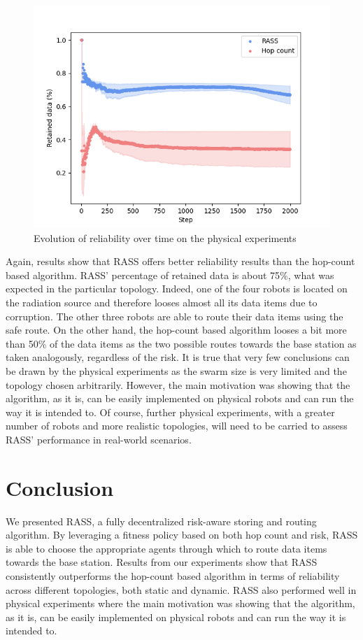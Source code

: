 \begin{figure}[htbp]
	\centering
    \includegraphics[width=0.90\columnwidth]{images/reliability.png}
    \caption{Evolution of reliability over time on the physical experiments}
    \label{results:physicalRelaibility}
\end{figure}


Again, results show that RASS offers better reliability results than the hop-count based algorithm. RASS' percentage of retained data is about 75\%, what was expected in the particular topology. Indeed, one of the four robots is located on the radiation source and therefore looses almost all its data items due to corruption. The other three robots are able to route their data items using the safe route. On the other hand, the hop-count based algorithm looses a bit more than 50\% of the data items as the two possible routes towards the base station as taken analogously, regardless of the risk. It is true that very few conclusions can be drawn by the physical experiments as the swarm size is very limited and the topology chosen arbitrarily. However, the main motivation was showing that the algorithm, as it is, can be easily implemented on physical robots and can run the way it is intended to. Of course, further physical experiments, with a greater number of robots and more realistic topologies, will need to be carried to assess RASS' performance in real-world scenarios.

\section{Conclusion}

We presented RASS, a fully decentralized risk-aware storing and routing algorithm. By leveraging a fitness policy based on both hop count and risk, RASS is able to choose the appropriate agents through which to route data items towards the base station. Results from our experiments show that RASS consistently outperforms the hop-count based algorithm in terms of reliability across different topologies, both static and dynamic. RASS also performed well in physical experiments where the main motivation was showing that the algorithm, as it is, can be easily implemented on physical robots and can run the way it is intended to.

